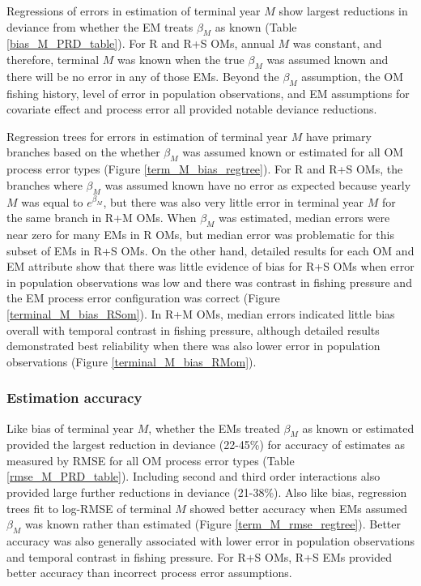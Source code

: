 \documentclass[
  12pt,
]{article}
\begin{document}
Regressions of errors in estimation of terminal year \(M\) show largest reductions in deviance from whether the EM treats \(\beta_M\) as known (Table \ref{bias_M_PRD_table}). For R and R+S OMs, annual \(M\) was constant, and therefore, terminal \(M\) was known when the true \(\beta_M\) was assumed known and there will be no error in any of those EMs. Beyond the \(\beta_M\) assumption, the OM fishing history, level of error in population observations, and EM assumptions for covariate effect and process error all provided notable deviance reductions.

Regression trees for errors in estimation of terminal year \(M\) have primary branches based on the whether \(\beta_M\) was assumed known or estimated for all OM process error types (Figure \ref{term_M_bias_regtree}). For R and R+S OMs, the branches where \(\beta_M\) was assumed known have no error as expected because yearly \(M\) was equal to \(e^{\beta_M}\), but there was also very little error in terminal year \(M\) for the same branch in R+M OMs. When \(\beta_M\) was estimated, median errors were near zero for many EMs in R OMs, but median error was problematic for this subset of EMs in R+S OMs. On the other hand, detailed results for each OM and EM attribute show that there was little evidence of bias for R+S OMs when error in population observations was low and there was contrast in fishing pressure and the EM process error configuration was correct (Figure \ref{terminal_M_bias_RSom}). In R+M OMs, median errors indicated little bias overall with temporal contrast in fishing pressure, although detailed results demonstrated best reliability when there was also lower error in population observations (Figure \ref{terminal_M_bias_RMom}).

\subsubsection*{Estimation accuracy}\label{estimation-accuracy}

Like bias of terminal year \(M\), whether the EMs treated \(\beta_M\) as known or estimated provided the largest reduction in deviance (22-45\%) for accuracy of estimates as measured by RMSE for all OM process error types (Table \ref{rmse_M_PRD_table}). Including second and third order interactions also provided large further reductions in deviance (21-38\%). Also like bias, regression trees fit to log-RMSE of terminal \(M\) showed better accuracy when EMs assumed \(\beta_M\) was known rather than estimated (Figure \ref{term_M_rmse_regtree}). Better accuracy was also generally associated with lower error in population observations and temporal contrast in fishing pressure. For R+S OMs, R+S EMs provided better accuracy than incorrect process error assumptions.
\end{document}
